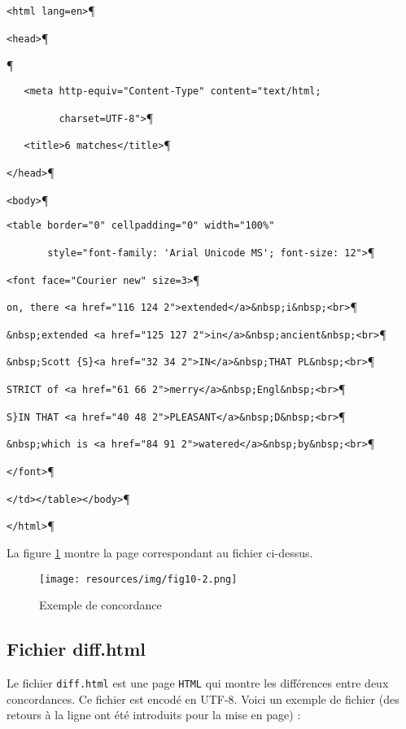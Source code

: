 \verb$<html lang=en>$\P

\verb$<head>$\P

\verb$$\P

\verb$   <meta http-equiv="Content-Type" content="text/html;$

\verb$         charset=UTF-8">$\P

\verb$   <title>6 matches</title>$\P

\verb$</head>$\P

\verb$<body>$\P

\verb$<table border="0" cellpadding="0" width="100%" $

\verb$       style="font-family: 'Arial Unicode MS'; font-size: 12">$\P

\verb$<font face="Courier new" size=3>$\P

\verb$on, there <a href="116 124 2">extended</a>&nbsp;i&nbsp;<br>$\P

\verb$&nbsp;extended <a href="125 127 2">in</a>&nbsp;ancient&nbsp;<br>$\P

\verb$&nbsp;Scott {S}<a href="32 34 2">IN</a>&nbsp;THAT PL&nbsp;<br>$\P

\verb$STRICT of <a href="61 66 2">merry</a>&nbsp;Engl&nbsp;<br>$\P

\verb+S}IN THAT <a href="40 48 2">PLEASANT</a>&nbsp;D&nbsp;<br>+\P

\verb+&nbsp;which is <a href="84 91 2">watered</a>&nbsp;by&nbsp;<br>+\P

\verb$</font>$\P

\verb$</td></table></body>$\P

\verb$</html>$\P


\bigskip
\noindent La figure \ref{fig-example-concordance-2} montre la page correspondant au fichier
ci-dessus.

\begin{figure}[!ht]
\begin{center}
\texttt{[image: resources/img/fig10-2.png]}
\caption{Exemple de concordance \label{fig-example-concordance-2}}
\end{center}
\end{figure}



\subsection{Fichier diff.html}
Le fichier \verb+diff.html+ est une page \verb+HTML+ qui montre les différences entre deux concordances. Ce fichier est encodé en UTF-8. Voici un exemple de fichier (des retours à la ligne ont été introduits pour la mise en page) :



